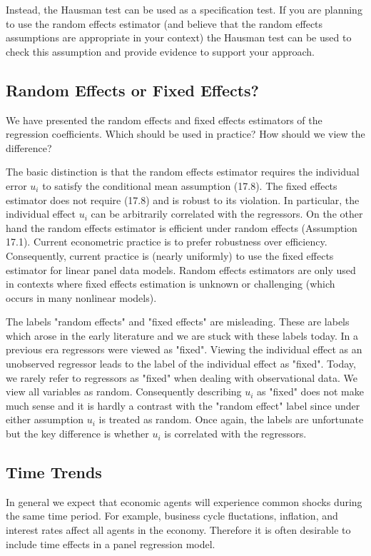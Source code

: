 \documentclass[10pt]{article}
\begin{document}
Instead, the Hausman test can be used as a specification test. If you are planning to use the random effects estimator (and believe that the random effects assumptions are appropriate in your context) the Hausman test can be used to check this assumption and provide evidence to support your approach.

\subsection{Random Effects or Fixed Effects?}
We have presented the random effects and fixed effects estimators of the regression coefficients. Which should be used in practice? How should we view the difference?

The basic distinction is that the random effects estimator requires the individual error $u_{i}$ to satisfy the conditional mean assumption (17.8). The fixed effects estimator does not require (17.8) and is robust to its violation. In particular, the individual effect $u_{i}$ can be arbitrarily correlated with the regressors. On the other hand the random effects estimator is efficient under random effects (Assumption 17.1). Current econometric practice is to prefer robustness over efficiency. Consequently, current practice is (nearly uniformly) to use the fixed effects estimator for linear panel data models. Random effects estimators are only used in contexts where fixed effects estimation is unknown or challenging (which occurs in many nonlinear models).

The labels "random effects" and "fixed effects" are misleading. These are labels which arose in the early literature and we are stuck with these labels today. In a previous era regressors were viewed as "fixed". Viewing the individual effect as an unobserved regressor leads to the label of the individual effect as "fixed". Today, we rarely refer to regressors as "fixed" when dealing with observational data. We view all variables as random. Consequently describing $u_{i}$ as "fixed" does not make much sense and it is hardly a contrast with the "random effect" label since under either assumption $u_{i}$ is treated as random. Once again, the labels are unfortunate but the key difference is whether $u_{i}$ is correlated with the regressors.

\subsection{Time Trends}
In general we expect that economic agents will experience common shocks during the same time period. For example, business cycle fluctations, inflation, and interest rates affect all agents in the economy. Therefore it is often desirable to include time effects in a panel regression model.
\end{document}
